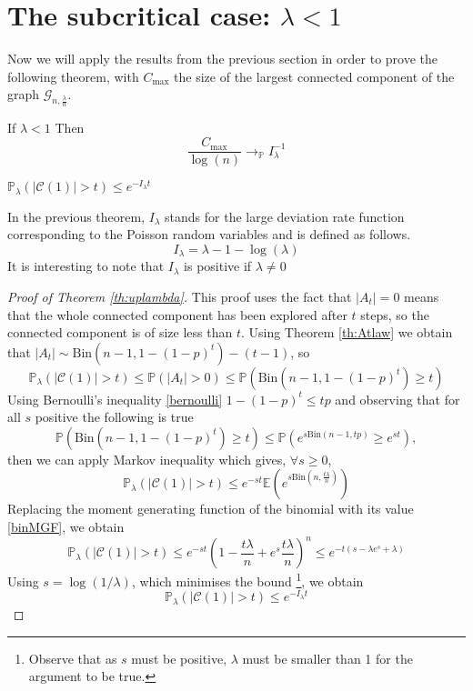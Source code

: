 \section{The subcritical case: $\lambda < 1$}
Now we will apply the results from the previous section in order to prove the following theorem, with $C_{\max}$ the size of the largest connected component of the graph $\mathcal{G}_{n, \frac{\lambda}{n}}$.
\begin{theorem}\label{th:subCritCV}
	If $\lambda < 1$
	\newline
	Then
	\begin{equation}
		\frac{C_{\max}}{\log(n)} \longrightarrow_\mathbb{P} I_{\lambda}^{-1}
	\end{equation}
\end{theorem}
\begin{theorem}\label{th:uplambda}
	$\mathbb{P}_{\lambda}(|\mathcal{C}(1)| >t) \leq e^{-I_{\lambda}t}$
\end{theorem}
In the previous theorem, $I_{\lambda}$ stands for the large deviation rate function corresponding to the Poisson random variables and is defined as follows.
\begin{equation}
	I_{\lambda} = \lambda - 1 - \log(\lambda)
\end{equation}
It is interesting to note that $I_\lambda$ is positive if $\lambda \neq 0$
\begin{proof}[Proof of Theorem \ref{th:uplambda}]
	This proof uses the fact that $|A_t| = 0$ means that the whole connected component has been explored after $t$ steps, so the connected component is of size less than $t$.
	Using Theorem \ref{th:Atlaw} we obtain that $|A_t| \sim \text{Bin}(n-1, 1-(1-p)^t) - (t-1)$, so 
	\begin{equation}
		\mathbb{P}_{\lambda}(|\mathcal{C}(1)| > t ) \leq \mathbb{P}(|A_t|>0) \leq \mathbb{P}(\text{Bin}(n-1, 1-(1-p)^t) \geq t)
	\end{equation}
	Using Bernoulli's inequality \eqref{bernoulli} $ 1- (1-p)^t \leq tp$ and observing that for all $s$ positive the following is true
	\begin{equation}
		\mathbb{P}(\text{Bin}(n-1, 1-(1-p)^t) \geq t) \leq \mathbb{P}(e^{s\text{Bin}(n-1, tp)} \geq e^{st}),
	\end{equation}
	then we can apply Markov inequality which gives, $\forall s \geq 0$, 
	\begin{equation}
		\mathbb{P}_{\lambda}(|\mathcal{C}(1)| > t ) \leq e^{-st}\mathbb{E}(e^{s\text{Bin}(n, \frac{t\lambda}{n})})
	\end{equation}
	Replacing the moment generating function of the binomial with its value \eqref{binMGF}, we obtain 
	\begin{equation}
		\mathbb{P}_{\lambda}(|\mathcal{C}(1)| > t ) \leq e^{-st}(1 - \frac{t\lambda}{n} + e^s\frac{t\lambda}{n})^n \leq e^{-t(s - \lambda e^s + \lambda)}
	\end{equation}
	Using $s=\log(1/\lambda)$, which minimises the bound \footnote{ Observe that as $s$ must be positive, $\lambda$ must be smaller than 1 for the argument to be true.}, we obtain
	\begin{equation}
		\mathbb{P}_{\lambda}(|\mathcal{C}(1)| >t) \leq e^{-I_{\lambda}t}
	\end{equation}
\end{proof}
